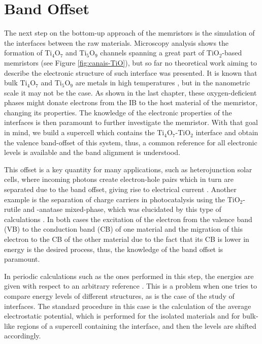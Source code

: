 \chapter{Band Offset}
\label{chap:band-offset}

The next step on the bottom-up approach of the memristors is the simulation of the interfaces between the raw materials. Microscopy analysis shows the formation of Ti$_4$O$_7$ and Ti$_5$O$_9$ channels spanning a great part of TiO$_2$-based memristors (see Figure \ref{fig:canais-TiO}), but so far no theoretical work aiming to describe the electronic structure of such interface was presented. It is known that bulk Ti$_4$O$_7$ and Ti$_5$O$_9$ are metals in high temperatures \cite{Bartholomew1969}, but in the nanometric scale it may not be the case. As shown in the last chapter, these oxygen-deficient phases might donate electrons from the IB to the host material of the memristor, changing its properties. The knowledge of the electronic properties of the interfaces is then paramount to further investigate the memristor. With that goal in mind, we build a supercell which contains the Ti$_4$O$_7$-TiO$_2$ interface and obtain the valence band-offset of this system, thus, a common reference for all electronic levels is available and the band alignment is understood. 

This offset is a key quantity for many applications, such as heterojunction solar cells, where incoming photons create electron-hole pairs which in turn are separated due to the band offset, giving rise to electrical current \cite{Liu2013}. Another example is the separation of charge carriers in photocatalysis using the TiO$_2$-rutile and -anatase mixed-phase, which was elucidated by this type of calculations \cite{Scanlon2013}. In both cases the excitation of the electron from the valence band (VB) to the conduction band (CB) of one material and the migration of this electron to the CB of the other material due to the fact that its CB is lower in energy is the desired process, thus, the knowledge of the band offset is paramount.

In periodic calculations such as the ones performed in this step, the energies are given with respect to an arbitrary reference \cite{Ihm1979,Blochl1994}. This is a problem when one tries to compare energy levels of different structures, as is the case of the study of interfaces. The standard procedure in this case is the calculation of the average electrostatic potential, which is performed for the isolated materials and for bulk-like regions of a supercell containing the interface, and then the levels are shifted accordingly.


